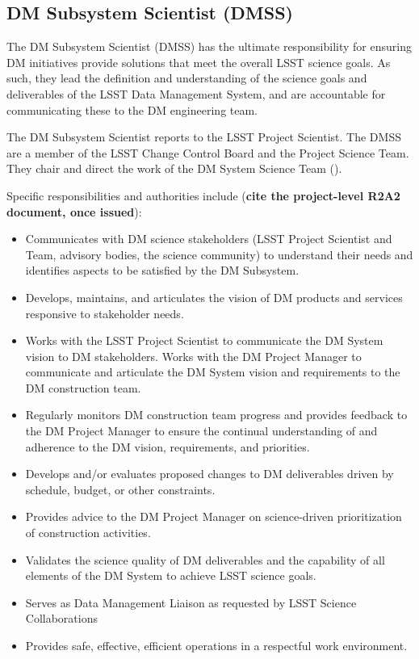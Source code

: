 \subsection{DM Subsystem Scientist (DMSS) \label{role:dmps} }

The DM Subsystem Scientist (DMSS) has the ultimate responsibility for ensuring DM initiatives provide solutions that meet the overall LSST science goals. As such, they lead the definition and understanding of the science goals and deliverables of the LSST Data Management System, and are accountable for communicating these to the DM engineering team.

The DM Subsystem Scientist reports to the LSST Project Scientist. The DMSS are a member of the LSST Change Control Board and the Project Science Team. They chair and direct the work of the DM System Science Team ().

Specific responsibilities and authorities include ({\bf cite the project-level R2A2 document, once issued}):


\begin{itemize}
\item Communicates with DM science stakeholders (LSST Project Scientist and Team, advisory bodies, the science community) to understand their needs and identifies aspects to be satisfied by the DM Subsystem.
\item Develops, maintains, and articulates the vision of DM products and services responsive to stakeholder needs.
\item Works with the LSST Project Scientist to communicate the DM System vision to DM stakeholders. Works with the DM Project Manager to communicate and articulate the DM System vision and requirements to the DM construction team.
\item Regularly monitors DM construction team progress and provides feedback to the DM Project Manager to ensure the continual understanding of and adherence to the DM vision, requirements, and priorities.
\item Develops and/or evaluates proposed changes to DM deliverables driven by schedule, budget, or other constraints.
\item Provides advice to the DM Project Manager on science-driven prioritization of construction activities.
\item Validates the science quality of DM deliverables and the capability of all elements of the DM System to achieve LSST science goals.
\item Serves as Data Management Liaison as requested by LSST Science Collaborations
\item Provides safe, effective, efficient operations in a respectful work environment.
\end{itemize}

